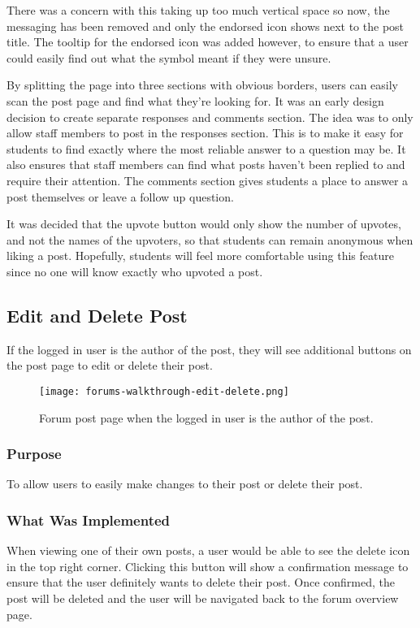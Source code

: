 There was a concern with this taking up too much vertical space so now, the messaging has been removed and only the endorsed icon shows next to the post title.
The tooltip for the endorsed icon was added however, to ensure that a user could easily find out what the symbol meant if they were unsure.

By splitting the page into three sections with obvious borders, users can easily scan the post page and find what they're looking for.
It was an early design decision to create separate responses and comments section.
The idea was to only allow staff members to post in the responses section.
This is to make it easy for students to find exactly where the most reliable answer to a question may be.
It also ensures that staff members can find what posts haven't been replied to and require their attention.
The comments section gives students a place to answer a post themselves or leave a follow up question.

It was decided that the upvote button would only show the number of upvotes, and not the names of the upvoters, so that students can remain anonymous when liking a post.
Hopefully, students will feel more comfortable using this feature since no one will know exactly who upvoted a post.

\subsection{Edit and Delete Post}
If the logged in user is the author of the post, they will see additional buttons on the post page to edit or delete their post.

\begin{figure}[h!]
    \texttt{[image: forums-walkthrough-edit-delete.png]}
    \centering
    \caption{Forum post page when the logged in user is the author of the post.}
\end{figure}

\subsubsection{Purpose}
To allow users to easily make changes to their post or delete their post.

\subsubsection{What Was Implemented}
When viewing one of their own posts, a user would be able to see the delete icon in the top right corner.
Clicking this button will show a confirmation message to ensure that the user definitely wants to delete their post.
Once confirmed, the post will be deleted and the user will be navigated back to the forum overview page.

